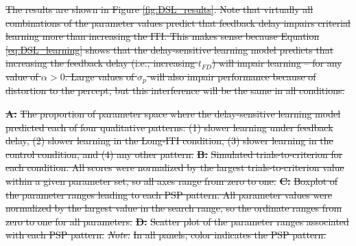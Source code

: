 \documentclass[doc, floatsintext]{apa7}
\providecommand{\DIFdel}[1]{{\protect\color{red}\sout{#1}}}                      %
\providecommand{\DIFdelFL}[1]{\DIFdel{#1}} %
\begin{document}
\DIFdel{The results are shown in Figure \ref{fig:DSL_results}. Note
that virtually all combinations of the parameter values
predict that feedback delay impairs criterial learning more
than increasing the ITI. This makes sense because Equation
\ref{eq:DSL_learning} shows that the delay-sensitive
learning model predicts that increasing the feedback delay
(i.e., increasing $t_{FD}$) will impair learning -- for any
value of $\alpha>0$. Large values of $\sigma_p$ will also
impair performance because of distortion to the percept, but
this interference will be the same in all conditions.
}%

{%
\textbf{\DIFdelFL{A:}} %
\DIFdelFL{The proportion of parameter space where
      the delay-sensitive learning model predicted each of
      four qualitative patterns: (1) slower learning under
      feedback delay, (2) slower learning in the Long-ITI
      condition, (3) slower learning in the control
      condition, and (4) any other pattern. 
      }\textbf{\DIFdelFL{B:}} %
\DIFdelFL{Simulated trials-to-criterion for each
      condition. All scores were normalized by the largest
      trials-to-criterion value within a given parameter
      set, so all axes range from zero to one. 
      }\textbf{\DIFdelFL{C:}} %
\DIFdelFL{Boxplot of the parameter ranges leading to
      each PSP pattern. All parameter values were normalized
      by the largest value in the search range, so the
      ordinate ranges from zero to one for all parameters.
      }\textbf{\DIFdelFL{D:}} %
\DIFdelFL{Scatter plot of the parameter ranges
      associated with each PSP pattern. 
      }\textit{\DIFdelFL{Note:}} %
\DIFdelFL{In all panels, color indicates the PSP
      pattern.
}}
\end{document}
